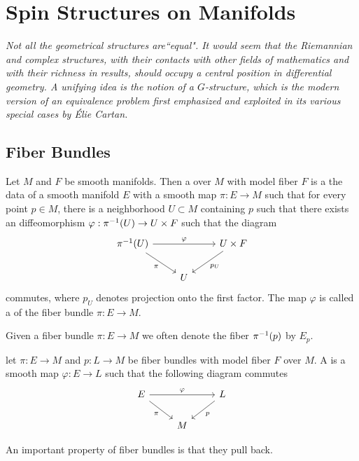\chapter{Spin Structures on Manifolds}
%
\subsectionend $ $\\
%
\emph{Not all the geometrical structures are``equal". It would seem that the
Riemannian and complex structures, with their contacts with other fields of
mathematics and with their richness in results, should occupy a central position
in differential geometry. A unifying idea is the notion of a $G$-structure, which
is the modern version of an equivalence problem first emphasized and exploited
in its various special cases by \'Elie Cartan.} \\
%
%
\subsectionend
%
\section{Fiber Bundles}
%
\begin{defn}
Let $M$ and $F$ be smooth manifolds. Then a  over $M$ with
model fiber $F$ is a the data of a smooth manifold $E$ with a smooth map
$\pi : E \to M$ such that for every point $p \in M$, there is a neighborhood
$U \subset M$ containing $p$ such that there exists an diffeomorphism
$\varphi : \pi^{-1}(U) \to U \times F$ such that the diagram
\[\begin{tikzcd}
\pi\inv(U) \ar[rr, "\varphi"] \ar[dr, "\pi"']&& U \times F \ar[dl, "p_U"] \\
& U
\end{tikzcd}\]
commutes, where $p_U$ denotes projection onto the first factor. The map $\varphi$ is
called a  of the fiber bundle $\pi : E \to M$.
\end{defn}
%
Given a fiber bundle $\pi : E \to M$ we often denote the fiber $\pi^{-1}(p)$
by $E_p$.
%
\begin{defn}
let $\pi : E \to M$ and $p : L \to M$ be fiber bundles with model fiber $F$
over $M$. A  is a smooth map $\varphi : E \to L$ such
that the following diagram commutes
\[\begin{tikzcd}
E \ar[dr, "\pi"']\ar[rr,"\varphi"] & & L \ar[dl, "p"] \\
& M
\end{tikzcd}\]
\end{defn}
%
An important property of fiber bundles is that they pull back.
